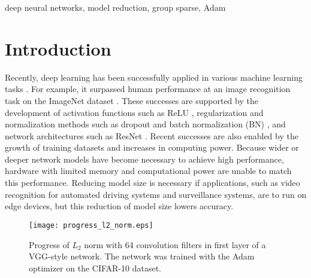 \documentclass[conference]{IEEEtran}
\begin{document}
\begin{IEEEkeywords}
deep neural networks, model reduction, group sparse, Adam
\end{IEEEkeywords}

\section{Introduction}\label{sec:introduction}
Recently, deep learning has been successfully applied in various machine learning tasks \cite{LeCun_2015}. 
For example, it surpassed human performance at an image recognition task on the ImageNet dataset \cite{He_2015}. 
These successes are supported by the development of activation functions such as ReLU \cite{Glorot_2011}, 
regularization and normalization methods such as dropout \cite{Srivastava_2014} and batch normalization (BN) \cite{Ioffe_2015}, and network architectures such as ResNet \cite{He_2016}. 
Recent successes are also enabled by the growth of training datasets and increases in computing power. 
Because wider or deeper network models have become necessary to achieve high performance, 
hardware with limited memory and computational power are unable to match this performance. 
Reducing model size is necessary if applications, such as video recognition for automated driving systems and surveillance systems, are to run on edge devices, 
but this reduction of model size lowers accuracy. 

\begin{figure}[!t] 
	\centerline{\texttt{[image: progress\_l2\_norm.eps]}}
	\caption{
		Progress of $L_2$ norm with 64 convolution filters in first layer of a VGG-style network. 
		The network was trained with the Adam optimizer on the CIFAR-10 dataset.
	}
	\label{fig:progress_l2_norm}
\end{figure}
\end{document}
